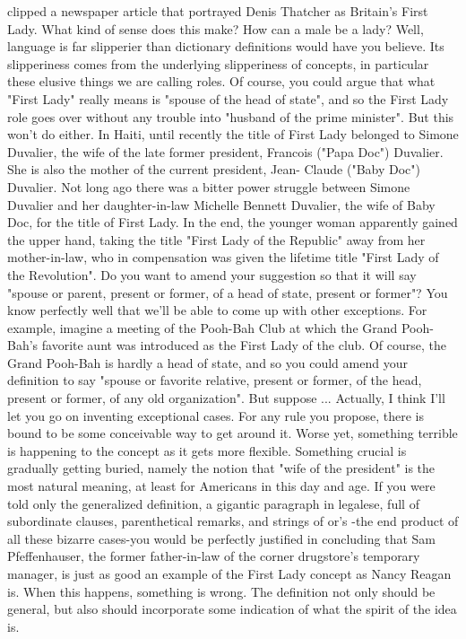 clipped a newspaper article that portrayed Denis Thatcher as Britain's First Lady.
         What kind of sense does this make? How can a male be a lady? Well, language
is far slipperier than dictionary definitions would have you believe. Its slipperiness
comes from the underlying slipperiness of concepts, in particular these elusive things
we are calling roles.
         Of course, you could argue that what "First Lady" really means is "spouse of
the head of state", and so the First Lady role goes over without any trouble into
"husband of the prime minister". But this won't do either. In Haiti, until recently the
title of First Lady belonged to Simone Duvalier, the wife of the late former president,
Francois ("Papa Doc") Duvalier. She is also the mother of the current president, Jean-
Claude ("Baby Doc") Duvalier. Not long ago there was a bitter power struggle
between Simone Duvalier and her daughter-in-law Michelle Bennett Duvalier, the
wife of Baby Doc, for the title of First Lady. In the end, the younger woman
apparently gained the upper hand, taking the title "First Lady of the Republic" away
from her mother-in-law, who in compensation was given the lifetime title "First Lady
of the Revolution".
         Do you want to amend your suggestion so that it will say "spouse or parent,
present or former, of a head of state, present or former"? You know perfectly well that
we'll be able to come up with other exceptions. For example, imagine a meeting of the
Pooh-Bah Club at which the Grand Pooh-Bah's favorite aunt was introduced as the
First Lady of the club. Of course, the Grand Pooh-Bah is hardly a head of state, and so
you could amend your definition to say "spouse or favorite relative, present or former,
of the head, present or former, of any old organization". But suppose ... Actually, I
think I'll let you go on inventing exceptional cases. For any rule you propose, there is
bound to be some conceivable way to get around it.
         Worse yet, something terrible is happening to the concept as it gets more
flexible. Something crucial is gradually getting buried, namely the notion that "wife
of the president" is the most natural meaning, at least for Americans in this day and
age. If you were told only the generalized definition, a gigantic paragraph in legalese,
full of subordinate clauses, parenthetical remarks, and strings of or's -the end product
of all these bizarre cases-you would be perfectly justified in concluding that Sam
Pfeffenhauser, the former father-in-law of the corner drugstore's temporary manager,
is just as good an example of the First Lady concept as Nancy Reagan is. When this
happens, something is wrong. The definition not only should be general, but also
should incorporate some indication of what the spirit of the idea is.

